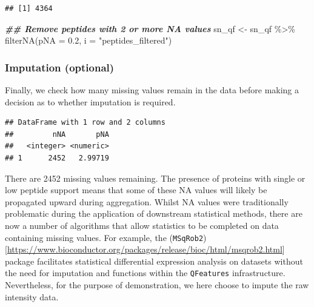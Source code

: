 \documentclass[9pt,a4paper,]{extarticle}
\newenvironment{Shaded}{\begin{snugshade}}{\end{snugshade}}
\newcommand{\AttributeTok}[1]{\textcolor[rgb]{0.77,0.63,0.00}{#1}}
\newcommand{\DocumentationTok}[1]{\textcolor[rgb]{0.56,0.35,0.01}{\textbf{\textit{#1}}}}
\newcommand{\FloatTok}[1]{\textcolor[rgb]{0.00,0.00,0.81}{#1}}
\newcommand{\FunctionTok}[1]{\textcolor[rgb]{0.00,0.00,0.00}{#1}}
\newcommand{\NormalTok}[1]{#1}
\newcommand{\OtherTok}[1]{\textcolor[rgb]{0.56,0.35,0.01}{#1}}
\newcommand{\SpecialCharTok}[1]{\textcolor[rgb]{0.00,0.00,0.00}{#1}}
\newcommand{\StringTok}[1]{\textcolor[rgb]{0.31,0.60,0.02}{#1}}
\begin{document}
\begin{verbatim}
## [1] 4364
\end{verbatim}

\begin{Shaded}
\begin{Highlighting}[]
\DocumentationTok{\#\# Remove peptides with 2 or more NA values}
\NormalTok{sn\_qf }\OtherTok{\textless{}{-}}\NormalTok{ sn\_qf }\SpecialCharTok{\%\textgreater{}\%}
  \FunctionTok{filterNA}\NormalTok{(}\AttributeTok{pNA =} \FloatTok{0.2}\NormalTok{,}
           \AttributeTok{i =} \StringTok{"peptides\_filtered"}\NormalTok{)}
\end{Highlighting}
\end{Shaded}

\hypertarget{imputation-optional-1}{%
\subsubsection{Imputation (optional)}\label{imputation-optional-1}}

Finally, we check how many missing values remain in the data before making a
decision as to whether imputation is required.

\begin{Shaded}
\end{Shaded}

\begin{verbatim}
## DataFrame with 1 row and 2 columns
##         nNA       pNA
##   <integer> <numeric>
## 1      2452   2.99719
\end{verbatim}

There are 2452 missing values remaining.
The presence of proteins with single or low peptide support means that some of
these NA values will likely be propagated upward during aggregation. Whilst NA
values were traditionally problematic during the application of downstream
statistical methods, there are now a number of algorithms that allow statistics
to be completed on data containing missing values. For example, the
(\texttt{MSqRob2}){[}\url{https://www.bioconductor.org/packages/release/bioc/html/msqrob2.html}{]}
\citetext{\citealp[\citet{Goeminne2020}]{Sticker2020}; \citealp{Goeminne2016}} package facilitates statistical
differential expression analysis on datasets without the need for imputation and
functions within the \texttt{QFeatures} infrastructure. Nevertheless, for the purpose of
demonstration, we here choose to impute the raw intensity data.
\end{document}
